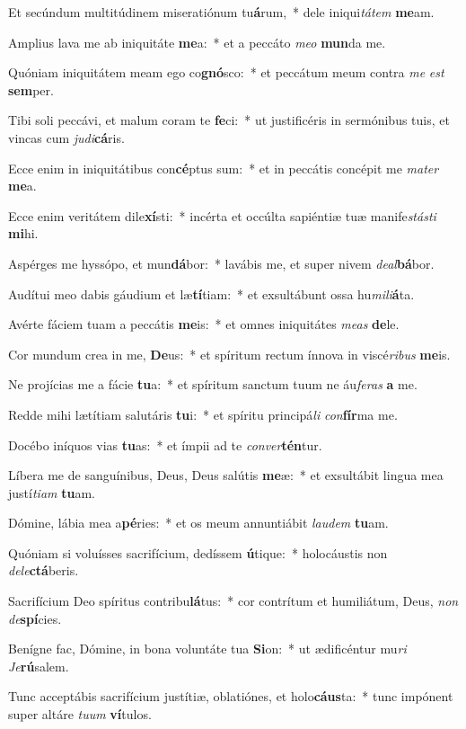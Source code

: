\item Et secúndum multitúdinem miseratiónum tu\textbf{á}rum,~* dele iniqui\textit{tátem} \textbf{me}am.
\item Amplius lava me ab iniquitáte \textbf{me}a:~* et a peccáto \textit{meo} \textbf{mun}da me.
\item Quóniam iniquitátem meam ego co\textbf{gnó}sco:~* et peccátum meum contra \textit{me} \textit{est} \textbf{sem}per.
\item Tibi soli peccávi, et malum coram te \textbf{fe}ci:~* ut justificéris in sermónibus tuis, et vincas cum \textit{judi}\textbf{cá}ris.
\item Ecce enim in iniquitátibus con\textbf{cé}ptus sum:~* et in peccátis concépit me \textit{mater} \textbf{me}a.
\item Ecce enim veritátem dile\textbf{xí}sti:~* incérta et occúlta sapiéntiæ tuæ manife\tinyhspace\textit{stásti} \textbf{mi}hi.
\item Aspérges me hyssópo, et mun\textbf{dá}bor:~* lavábis me, et super nivem \textit{deal}\textbf{bá}bor.
\item Audítui meo dabis gáudium et læ\textbf{tí}tiam:~* et exsultábunt ossa hu\textit{mili}\textbf{á}ta.
\item Avérte fáciem tuam a peccátis \textbf{me}is:~* et omnes iniquitátes \textit{meas} \textbf{de}le.
\item Cor mundum crea in me, \textbf{De}us:~* et spíritum rectum ínnova in viscé\textit{ribus} \textbf{me}is.
\item Ne projícias me a fácie \textbf{tu}a:~* et spíritum sanctum tuum ne áu\textit{feras} \textbf{a} me.
\item Redde mihi lætítiam salutáris \textbf{tu}i:~* et spíritu principá\spurhspace\textit{li} \textit{con}\textbf{fír}ma me.
\item Docébo iníquos vias \textbf{tu}as:~* et ímpii ad te \textit{conver}\textbf{tén}tur.
\item Líbera me de sanguínibus, Deus, Deus salútis \textbf{me}æ:~* et exsultábit lingua mea justí\textit{tiam} \textbf{tu}am.
\item Dómine, lábia mea a\textbf{pé}ries:~* et os meum annuntiábit \textit{laudem} \textbf{tu}am.
\item Quóniam si voluísses sacrifícium, dedíssem \textbf{ú}tique:~* holocáustis non \textit{dele}\textbf{ctá}beris.
\item Sacrifícium Deo spíritus contribu\textbf{lá}tus:~* cor contrítum et humiliátum, Deus, \textit{non} \textit{de}\textbf{spí}cies.
\item Benígne fac, Dómine, in bona voluntáte tua \textbf{Si}on:~* ut ædificéntur mu\tinyhspace\textit{ri} \textit{Je}\textbf{rú}salem.
\item Tunc acceptábis sacrifícium justítiæ, oblatiónes, et holo\textbf{cáus}ta:~* tunc impónent super altáre \textit{tuum} \textbf{ví}tulos.
